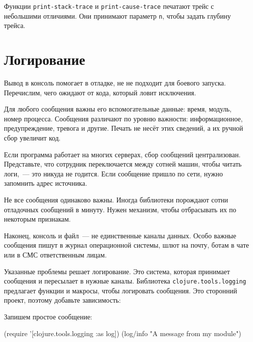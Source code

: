 \fi

Функции \verb|print-stack-trace| и \verb|print-cause-trace| печатают трейс с
небольшими отличиями. Они принимают параметр \verb|n|, чтобы задать глубину
трейса.

\section{Логирование}


Вывод в консоль помогает в отладке, не не подходит для боевого
запуска. Перечислим, чего ожидают от кода, который ловит исключения.

Для любого сообщения важны его вспомогательные данные: время, модуль, номер
процесса. Сообщения различают по уровню важности: информационное,
предупреждение, тревога и другие. Печать не несёт этих сведений, а их ручной
сбор увеличит код.

Если программа работает на многих серверах, сбор сообщений
централизован. Представьте, что сотрудник переключается между сотней машин,
чтобы читать логи,~--- это никуда не годится. Если сообщение пришло по сети,
нужно запомнить адрес источника.

Не все сообщения одинаково важны. Иногда библиотеки порождают сотни отладочных
сообщений в минуту. Нужен механизм, чтобы отбрасывать их по некоторым признакам.

Наконец, консоль и файл~--- не единственные каналы данных. Особо важные
сообщения пишут в журнал операционной системы, шлют на почту, ботам в чате или в
СМС ответственным лицам.

Указанные проблемы решает логирование. Это система, которая принимает сообщения
и пересылает в нужные каналы. Библиотека \verb|clojure.tools.logging|
предлагает функции и макросы, чтобы логировать сообщения. Это сторонний проект,
поэтому добавьте зависимость:


\begin{english}
  \begin{clojure}
  \end{clojure}
\end{english}

\noindent
Запишем простое сообщение:

\ifx\devicetype\mobile

\begin{english}
  \begin{clojure}
(require
  '[clojure.tools.logging :as log])
(log/info "A message from my module")
  \end{clojure}
\end{english}

